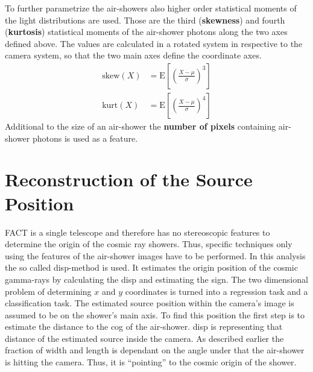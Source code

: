 To further parametrize the air-showers also higher order statistical moments of
the light distributions are used. Those are the third (\textbf{skewness}) and
fourth (\textbf{kurtosis}) statistical moments of the air-shower photons along
the two axes defined above. The values are calculated in a rotated system in
respective to the camera system, so that the two main axes define the
coordinate axes.
%
\begin{align}
  \text{skew}(X) &= \text{E}\left[\left(\frac{X-\mu}{\sigma}\right)^3\right] \label{eq:skew} \\
  \text{kurt}(X) &= \text{E}\left[\left(\frac{X-\mu}{\sigma}\right)^4\right]  \label{eq:kurt}
\end{align}
%
Additional to the size of an air-shower the \textbf{number of pixels}
containing air-shower photons is used as a feature.
%
\section{Reconstruction of the Source Position}
\label{sec:source_pos}%
%
FACT is a single telescope and therefore has no stereoscopic features to
determine the origin of the cosmic ray showers. Thus, specific techniques only
using the features of the air-shower images have to be performed. In this
analysis the so called disp-method is used. It estimates the origin position of
the cosmic gamma-rays by calculating the disp and estimating the sign. The two
dimensional problem of determining $x$ and $y$ coordinates is turned into a
regression task and a classification task. The estimated source position within
the camera's image is assumed to be on the shower's main axis. To find this
position the first step is to estimate the distance to the cog of the
air-shower. disp is representing that distance of the estimated source inside
the camera. As described earlier the fraction of width and length is dependant
on the angle under that the air-shower is hitting the camera. Thus, it is
\enquote{pointing} to the cosmic origin of the shower.

